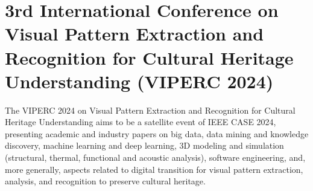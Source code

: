 \documentclass[
	openany, %
	parskip=full, %
	12pt, %
	a4paper, %
]{conferencebooklet} %
\begin{document}


\newpage
\section{3rd International Conference on Visual Pattern Extraction and Recognition for Cultural Heritage Understanding (VIPERC 2024)}

The VIPERC 2024 on Visual Pattern Extraction and Recognition for Cultural Heritage Understanding aims to be a satellite event of IEEE CASE 2024, presenting academic and industry papers on big data, data mining and knowledge discovery, machine learning and deep learning, 3D modeling and simulation (structural, thermal, functional and acoustic analysis), software engineering, and, more generally, aspects related to digital transition for visual pattern extraction, analysis, and recognition to preserve cultural heritage.
\end{document}
